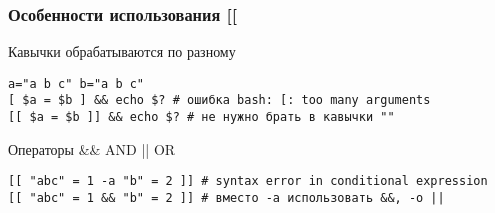 \begin{frame}[fragile]
    \frametitle{ Особенности использования [[ }
    \begin{block}{Кавычки обрабатываются по разному}
	\small\begin{lstlisting}
a="a b c" b="a b c"
[ $a = $b ] && echo $? # ошибка bash: [: too many arguments
[[ $a = $b ]] && echo $? # не нужно брать в кавычки ""
\end{lstlisting}
    \end{block}

    \begin{block}{ Операторы \&\& AND || OR }
	\small\begin{lstlisting}
[[ "abc" = 1 -a "b" = 2 ]] # syntax error in conditional expression
[[ "abc" = 1 && "b" = 2 ]] # вместо -a использовать &&, -o ||
\end{lstlisting}
    \end{block}
\end{frame}
